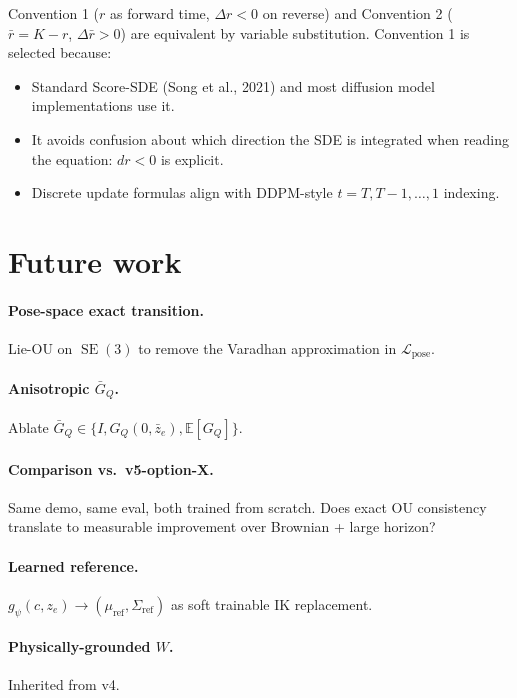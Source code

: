 \documentclass[11pt,a4paper]{article}
\DeclareMathOperator{\SE}{SE}
\newcommand{\E}{\mathbb{E}}
\newcommand{\Loss}{\mathcal{L}}
\newcommand{\GQ}{G_Q}
\newcommand{\GQbar}{\bar G_Q}
\begin{document}
Convention 1 ($r$ as forward time, $\Delta r < 0$ on reverse) and Convention 2 ($\bar r = K - r$, $\Delta \bar r > 0$) are equivalent by variable substitution. Convention 1 is selected because:
\begin{itemize}[noitemsep]
    \item Standard Score-SDE (Song et al., 2021) and most diffusion model implementations use it.
    \item It avoids confusion about which direction the SDE is integrated when reading the equation: $dr < 0$ is explicit.
    \item Discrete update formulas align with DDPM-style $t = T, T-1, \ldots, 1$ indexing.
\end{itemize}

\section{Future work}

\paragraph{Pose-space exact transition.} Lie-OU on $\SE(3)$ to remove the Varadhan approximation in $\Loss_\text{pose}$.

\paragraph{Anisotropic $\GQbar$.} Ablate $\GQbar \in \{I, \GQ(0, \bar z_e), \E[\GQ]\}$.

\paragraph{Comparison vs.\ v5-option-X.} Same demo, same eval, both trained from scratch. Does exact OU consistency translate to measurable improvement over Brownian + large horizon?

\paragraph{Learned reference.} $g_\psi(c, z_e) \to (\mu_\text{ref}, \Sigma_\text{ref})$ as soft trainable IK replacement.

\paragraph{Physically-grounded $W$.} Inherited from v4.
\end{document}
